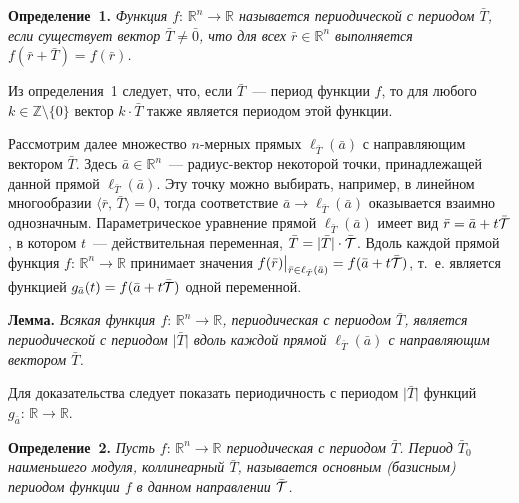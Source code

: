 \textbf{Определение~1.} {\it Функция $f:\,{\mathbb R}^{n}\to {\mathbb R}$ называется периодической с периодом $\bar{T}$, если существует вектор $\bar{T}\neq\bar{0}$, что для всех $\bar{r}\in{\mathbb R}^{n}$ выполняется $f(\bar{r}+\bar{T})=f(\bar{r})$.}

Из определения~1 следует, что, если $\bar{T}$~--- период функции $f$, то для любого  $k\in{\mathbb Z}\setminus\lbrace 0\rbrace$ вектор $k\cdot\bar{T}$ также является периодом этой функции.

Рассмотрим далее множество $n$-мерных прямых $\ell_{\bar{T}}(\bar{a})$ с направляющим вектором $\bar{T}$. Здесь $\bar{a}\in{\mathbb R}^{n}$~---  радиус-вектор некоторой точки, принадлежащей данной прямой $\ell_{\bar{T}}(\bar{a})$. Эту точку можно выбирать, например, в линейном многообразии $\langle\bar{r},\,\bar{T}\rangle=0$, тогда соответствие $\bar{a}\to\ell_{\bar{T}}(\bar{a})$ оказывается взаимно однозначным. Параметрическое уравнение прямой $\ell_{\bar{T}}(\bar{a})$ имеет вид  $\bar{r}=\bar{a}+t\bar{{\cal T}}$, в котором $t$~--- действительная переменная, $\bar{T}=\vert\bar{T}\vert\cdot\bar{{\cal T}}$. Вдоль каждой прямой функция $f:\,{\mathbb R}^{n}\to {\mathbb R}$ принимает значения $\bigl.f(\bar{r})\bigr|_{\bar{r}\in\ell_{\bar{T}}(\bar{a})}=f(\bar{a}+t\bar{{\cal T}})$, т.~е. является функцией $g_{\bar{a}}(t)=f(\bar{a}+t\bar{{\cal T}})$ одной переменной.

\textbf{Лемма.} {\it Всякая функция $f:\,{\mathbb R}^{n}\to {\mathbb R}$,  периодическая с периодом $\bar{T}$, является периодической с периодом $\vert\bar{T}\vert$ вдоль каждой прямой $\ell_{\bar{T}}(\bar{a})$ с направляющим вектором $\bar{T}$.}

Для доказательства следует показать периодичность с периодом $\vert\bar{T}\vert$  функций $g_{\bar{a}}:\,{\mathbb R}\to{\mathbb R}$.

\textbf{Определение~2.} {\it Пусть $f:\,{\mathbb R}^{n}\to {\mathbb R}$  периодическая с периодом $\bar{T}$. Период $\bar{T}_{0}$ наименьшего модуля, коллинеарный $\bar{T}$, называется основным (базисным) периодом функции $f$ в данном направлении $\bar{{\cal T}}$.}

